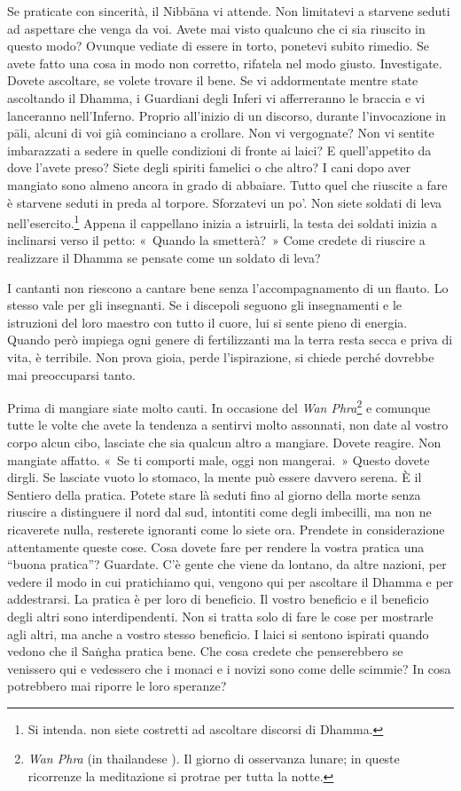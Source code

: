 Se praticate con sincerità, il Nibbāna vi attende. Non limitatevi
a starvene seduti ad aspettare che venga da voi. Avete mai visto
qualcuno che ci sia riuscito in questo modo? Ovunque vediate di essere
in torto, ponetevi subito rimedio. Se avete fatto una cosa in modo non
corretto, rifatela nel modo giusto. Investigate. Dovete ascoltare, se
volete trovare il bene. Se vi addormentate mentre state ascoltando il
Dhamma, i Guardiani degli Inferi vi afferreranno le braccia e vi
lanceranno nell'Inferno. Proprio all'inizio di un discorso, durante
l'invocazione in pāli, alcuni di voi già cominciano a crollare. Non vi
vergognate? Non vi sentite imbarazzati a sedere in quelle condizioni di
fronte ai laici? E quell'appetito da dove l'avete preso? Siete degli
spiriti famelici o che altro? I cani dopo aver mangiato sono almeno
ancora in grado di abbaiare. Tutto quel che riuscite a fare è starvene
seduti in preda al torpore. Sforzatevi un po'. Non siete soldati di leva
nell'esercito.\footnote{Si intenda. non siete costretti ad ascoltare
  discorsi di Dhamma.} Appena il cappellano inizia a istruirli, la testa
dei soldati inizia a inclinarsi verso il petto: «~Quando la smetterà?~»
Come credete di riuscire a realizzare il Dhamma se pensate come un
soldato di leva?

I cantanti non riescono a cantare bene senza l'accompagnamento di un
flauto. Lo stesso vale per gli insegnanti. Se i discepoli seguono gli
insegnamenti e le istruzioni del loro maestro con tutto il cuore, lui si
sente pieno di energia. Quando però impiega ogni genere di fertilizzanti
ma la terra resta secca e priva di vita, è terribile. Non prova gioia,
perde l'ispirazione, si chiede perché dovrebbe mai preoccuparsi tanto.

Prima di mangiare siate molto cauti. In occasione del \emph{Wan
Phra}\footnote{\emph{Wan Phra} (in thailandese ). Il giorno di
  osservanza lunare; in queste ricorrenze la meditazione si protrae per
  tutta la notte.} e comunque tutte le volte che avete la tendenza a
sentirvi molto assonnati, non date al vostro corpo alcun cibo, lasciate
che sia qualcun altro a mangiare. Dovete reagire. Non mangiate affatto.
«~Se ti comporti male, oggi non mangerai.~» Questo dovete dirgli. Se
lasciate vuoto lo stomaco, la mente può essere davvero serena. È il
Sentiero della pratica. Potete stare là seduti fino al giorno della
morte senza riuscire a distinguere il nord dal sud, intontiti come degli
imbecilli, ma non ne ricaverete nulla, resterete ignoranti come lo siete
ora. Prendete in considerazione attentamente queste cose. Cosa dovete
fare per rendere la vostra pratica una ``buona pratica''? Guardate. C'è
gente che viene da lontano, da altre nazioni, per vedere il modo in cui
pratichiamo qui, vengono qui per ascoltare il Dhamma e per addestrarsi.
La pratica è per loro di beneficio. Il vostro beneficio e il beneficio
degli altri sono interdipendenti. Non si tratta solo di fare le cose per
mostrarle agli altri, ma anche a vostro stesso beneficio. I laici si
sentono ispirati quando vedono che il Saṅgha pratica bene. Che cosa
credete che penserebbero se venissero qui e vedessero che i monaci e i
novizi sono come delle scimmie? In cosa potrebbero mai riporre le loro
speranze?

